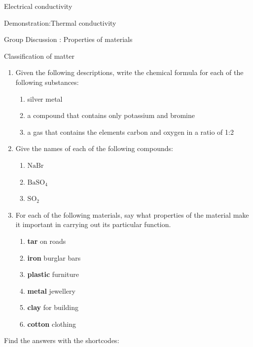 \begin{iexperiment}{Electrical conductivity}
\begin{gexperiment}{Demonstration:Thermal conductivity}
\begin{Discussion}{Group Discussion : Properties of materials}
\begin{eocexercises}{Classification of matter }
{\begin{enumerate}[noitemsep, label=\textbf{\arabic*}. ]
\begin{enumerate}[noitemsep, label=\textbf{\alph*}. ]
\label{m38706*uid148}\item What property of metals allows you to do this?
\end{enumerate}
\label{m38706*uid149}\item Given the following descriptions, write the chemical formula for each of the following substances:
\label{m38706*id68304}\begin{enumerate}[noitemsep, label=\textbf{\alph*}. ] 
            \label{m38706*uid150}\item silver metal
\label{m38706*uid151}\item a compound that contains only potassium and bromine
\label{m38706*uid152}\item a gas that contains the elements carbon and oxygen in a ratio of 1:2
\end{enumerate}
\label{m38706*uid153}\item Give the names of each of the following compounds:
\label{m38706*id68358}\begin{enumerate}[noitemsep, label=\textbf{\alph*}. ] 
            \label{m38706*uid154}\item $\mathrm{NaBr}$
\label{m38706*uid155}\item ${\mathrm{BaSO}}_{4}$\label{m38706*uid156}\item ${\mathrm{SO}}_{2}$ \end{enumerate}
\label{m38706*uid157}\item For each of the following materials, say what properties of the material make it important in carrying out its particular function.
\label{m38706*id68436}\begin{enumerate}[noitemsep, label=\textbf{\alph*}. ] 
            \label{m38706*uid158}\item \textbf{tar} on roads
\label{m38706*uid159}\item \textbf{iron} burglar bars
\label{m38706*uid160}\item \textbf{plastic} furniture
\label{m38706*uid161}\item \textbf{metal} jewellery
\label{m38706*uid162}\item \textbf{clay} for building
\label{m38706*uid163}\item \textbf{cotton} clothing
\end{enumerate}
\end{enumerate}
  \label{m38706**end}
  \label{09a7a4809656be0b739ee130746cd803**end}
\par {} Find the answers with the shortcodes:
}
\end{eocexercises}
\end{Discussion}
\end{gexperiment}
\end{iexperiment}
